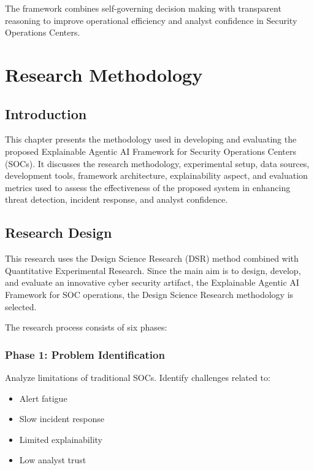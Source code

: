 \documentclass[12pt,a4paper]{report}
\begin{document}
The framework combines self-governing decision making with transparent reasoning to improve operational efficiency and analyst confidence in Security Operations Centers.

\chapter{Research Methodology}
\label{ch:methodology}

\section{Introduction}
\label{sec:method_intro}

This chapter presents the methodology used in developing and evaluating the proposed Explainable Agentic AI Framework for Security Operations Centers (SOCs). It discusses the research methodology, experimental setup, data sources, development tools, framework architecture, explainability aspect, and evaluation metrics used to assess the effectiveness of the proposed system in enhancing threat detection, incident response, and analyst confidence.

\section{Research Design}
\label{sec:research_design}

This research uses the Design Science Research (DSR) method combined with Quantitative Experimental Research. Since the main aim is to design, develop, and evaluate an innovative cyber security artifact, the Explainable Agentic AI Framework for SOC operations, the Design Science Research methodology is selected.

The research process consists of six phases:

\subsection{Phase 1: Problem Identification}
Analyze limitations of traditional SOCs. Identify challenges related to:
\begin{itemize}
    \item Alert fatigue
    \item Slow incident response
    \item Limited explainability
    \item Low analyst trust
\end{itemize}
\end{document}
